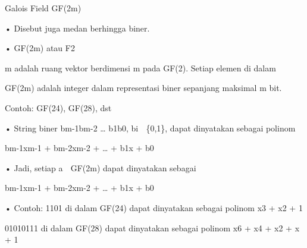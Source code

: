 \documentclass{article}
\begin{document}

Galois Field GF(2m)

• Disebut juga medan berhingga biner.  

• GF(2m) atau F2

m adalah ruang vektor berdimensi m pada GF(2).  Setiap elemen di dalam 

GF(2m) adalah integer dalam representasi biner sepanjang maksimal m bit. 

    Contoh: GF(24), GF(28), dst 

• String biner bm-1bm-2 … b1b0,  bi  \{0,1\}, dapat dinyatakan sebagai polinom

            bm-1xm-1 + bm-2xm-2 + … + b1x + b0

• Jadi, setiap a  GF(2m) dapat dinyatakan sebagai 


 bm-1xm-1 + bm-2xm-2 + … + b1x + b0 

• Contoh:  1101  di dalam GF(24) dapat dinyatakan sebagai polinom x3 + x2 + 1 

                    01010111 di dalam GF(28) dapat dinyatakan sebagai polinom x6 + x4 + x2 + x + 1
\end{document}
